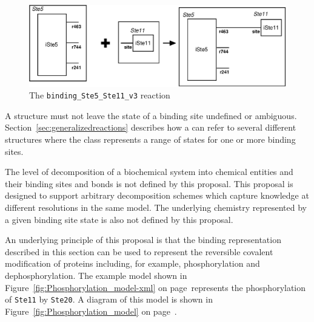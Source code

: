 \documentclass{cekarticle}
\begin{document}
\begin{figure}[h]
  \vspace*{8pt}
  \centering
  \includegraphics[scale = 0.7]{binding_Ste5_Ste11_v3.eps}
  \caption{The \texttt{binding\_Ste5\_Ste11\_v3} reaction}
  \label{fig:binding_Ste5_Ste11_v3}
\end{figure}

A  structure must not leave the state of a binding site undefined or ambiguous.
Section~\ref{sec:generalizedreactions} describes how a  can refer to 
several different  structures where the class represents a range of states for one
or more binding sites.

The level of decomposition of a biochemical system into chemical entities and their binding sites and
bonds is not defined by this proposal.  This proposal is designed to support arbitrary decomposition
schemes which capture knowledge at different resolutions in the same model. The
underlying chemistry represented by a given binding site state is also not defined by this proposal.

An underlying principle of this proposal is that the binding representation described in this section
can be used to represent the reversible covalent modification of proteins including, for example,
phosphorylation and dephosphorylation.  The example model shown in
Figure~\ref{fig:Phosphorylation_model-xml} on page~\pageref{fig:Phosphorylation_model-xml}represents
the phosphorylation of \texttt{Ste11} by \texttt{Ste20}.  A diagram of this model is shown in
Figure~\ref{fig:Phosphorylation_model} on page~\pageref{fig:Phosphorylation_model}.
\end{document}
